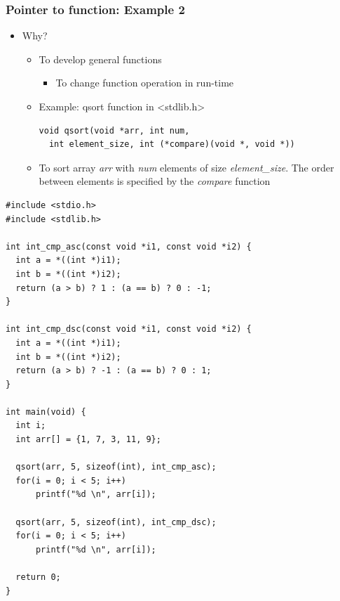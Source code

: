 \documentclass{../c-lecture}
\begin{document}
\begin{frame}[fragile]
  \frametitle{Pointer to function: Example 2}
  \begin{itemize}
    \item Why?
    \begin{itemize}
      \item To develop general functions
      \begin{itemize}
        \item To change function operation in run-time
      \end{itemize}
      \item Example: qsort function in <stdlib.h>
      \begin{verbatim}
void qsort(void *arr, int num,
  int element_size, int (*compare)(void *, void *))
      \end{verbatim}
      \item
        To sort array \textit{\color{YellowOrange} arr} with
        \textit{\color{LimeGreen} num} elements of size
        \textit{\color{Cyan} element\_size}. The order between elements is
        specified by the \textit{\color{RubineRed} compare} function
    \end{itemize}
  \end{itemize}
\end{frame}

\begin{frame}[fragile]
  \tiny
  \begin{verbatim}
#include <stdio.h>
#include <stdlib.h>

int int_cmp_asc(const void *i1, const void *i2) {
  int a = *((int *)i1);
  int b = *((int *)i2);
  return (a > b) ? 1 : (a == b) ? 0 : -1;
}

int int_cmp_dsc(const void *i1, const void *i2) {
  int a = *((int *)i1);
  int b = *((int *)i2);
  return (a > b) ? -1 : (a == b) ? 0 : 1;
}

int main(void) {
  int i;
  int arr[] = {1, 7, 3, 11, 9};

  qsort(arr, 5, sizeof(int), int_cmp_asc);
  for(i = 0; i < 5; i++)
      printf("%d \n", arr[i]);

  qsort(arr, 5, sizeof(int), int_cmp_dsc);
  for(i = 0; i < 5; i++)
      printf("%d \n", arr[i]);

  return 0;
}
  \end{verbatim}
\end{frame}
\end{document}
